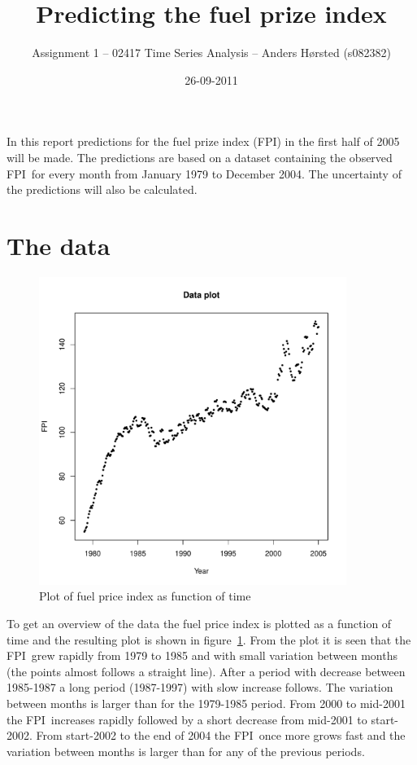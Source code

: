 \documentclass[11pt]{article}
\title{Predicting the fuel prize index}
\date{26-09-2011}
\author{Assignment 1 -- 02417 Time Series Analysis -- Anders Hørsted (s082382)}
\date{} %
\newcommand\fpi{FPI}
\begin{document}
\maketitle

In this report predictions for the fuel prize index (\fpi) in the first half of 2005 will be made. The predictions are based on a dataset containing the observed \fpi\ for every month from January 1979 to December 2004. The uncertainty of the predictions will also be calculated. \\ 

\section*{The data}

\begin{figure}
    \centering
    \includegraphics[width=100mm]{data-plot.pdf}
    \caption{Plot of fuel price index as function of time}
    \label{fig:plot-question-1}
\end{figure}

To get an overview of the data the fuel price index is plotted as a function of time and the resulting plot is shown in figure~\ref{fig:plot-question-1}. From the plot it is seen that the \fpi\ grew rapidly from 1979 to 1985 and with small variation between months (the points almost follows a straight line). After a period with decrease between 1985-1987 a long period (1987-1997) with slow increase follows. The variation between months is larger than for the 1979-1985 period. From 2000 to mid-2001 the \fpi\ increases rapidly followed by a short decrease from mid-2001 to start-2002. From start-2002 to the end of 2004 the \fpi\ once more grows fast and the variation between months is larger than for any of the previous periods. \\
\end{document}
